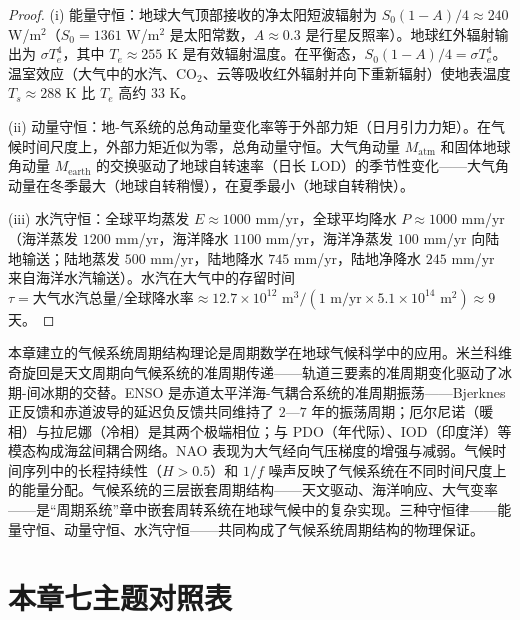 \begin{proof}
(i) 能量守恒：地球大气顶部接收的净太阳短波辐射为 $S_0(1-A)/4 \approx 240$ W/m$^2$（$S_0 = 1361$ W/m$^2$ 是太阳常数，$A \approx 0.3$ 是行星反照率）。地球红外辐射输出为 $\sigma T_e^4$，其中 $T_e \approx 255$ K 是有效辐射温度。在平衡态，$S_0(1-A)/4 = \sigma T_e^4$。温室效应（大气中的水汽、CO$_2$、云等吸收红外辐射并向下重新辐射）使地表温度 $T_s \approx 288$ K 比 $T_e$ 高约 $33$ K。

(ii) 动量守恒：地-气系统的总角动量变化率等于外部力矩（日月引力力矩）。在气候时间尺度上，外部力矩近似为零，总角动量守恒。大气角动量 $M_{\text{atm}}$ 和固体地球角动量 $M_{\text{earth}}$ 的交换驱动了地球自转速率（日长 LOD）的季节性变化——大气角动量在冬季最大（地球自转稍慢），在夏季最小（地球自转稍快）。

(iii) 水汽守恒：全球平均蒸发 $E \approx 1000$ mm/yr，全球平均降水 $P \approx 1000$ mm/yr（海洋蒸发 $1200$ mm/yr，海洋降水 $1100$ mm/yr，海洋净蒸发 $100$ mm/yr 向陆地输送；陆地蒸发 $500$ mm/yr，陆地降水 $745$ mm/yr，陆地净降水 $245$ mm/yr 来自海洋水汽输送）。水汽在大气中的存留时间 $\tau = \text{大气水汽总量}/\text{全球降水率} \approx 12.7 \times 10^{12} \text{ m}^3 / (1 \text{ m/yr} \times 5.1 \times 10^{14} \text{ m}^2) \approx 9$ 天。
\end{proof}

\begin{remark}[与全书的衔接]
本章建立的气候系统周期结构理论是周期数学在地球气候科学中的应用。米兰科维奇旋回是天文周期向气候系统的准周期传递——轨道三要素的准周期变化驱动了冰期-间冰期的交替。ENSO 是赤道太平洋海-气耦合系统的准周期振荡——Bjerknes 正反馈和赤道波导的延迟负反馈共同维持了 $2$—$7$ 年的振荡周期；厄尔尼诺（暖相）与拉尼娜（冷相）是其两个极端相位；与 PDO（年代际）、IOD（印度洋）等模态构成海盆间耦合网络。NAO 表现为大气经向气压梯度的增强与减弱。气候时间序列中的长程持续性（$H > 0.5$）和 $1/f$ 噪声反映了气候系统在不同时间尺度上的能量分配。气候系统的三层嵌套周期结构——天文驱动、海洋响应、大气变率——是“周期系统”章中嵌套周转系统在地球气候中的复杂实现。三种守恒律——能量守恒、动量守恒、水汽守恒——共同构成了气候系统周期结构的物理保证。
\end{remark}

\section*{本章七主题对照表}

